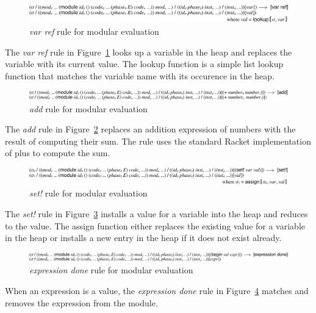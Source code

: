 \begin{figure}[!h]
  \includegraphics[width=\textwidth]{figures/eval-reduction1}
\caption{\emph{var ref} rule for modular evaluation}
\label{fig:eval-reduction1}
\end{figure}
The \emph{var ref} rule in Figure~\ref{fig:eval-reduction1} looks up a variable in the heap and replaces the variable with its current value.
The lookup function is a simple list lookup function that matches the variable name with its occurence in the heap. 

\begin{figure}[!h]
  \includegraphics[width=\textwidth]{figures/eval-reduction2}
\caption{\emph{add} rule for modular evaluation}
\label{fig:eval-reduction2}
\end{figure}
The \emph{add} rule in Figure~\ref{fig:eval-reduction2} replaces an addition expression of numbers with the result of computing their sum.
The rule uses the standard Racket implementation of plus to compute the sum.

\begin{figure}[!h]
  \includegraphics[width=\textwidth]{figures/eval-reduction3}
\caption{\emph{set!} rule for modular evaluation}
\label{fig:eval-reduction3}
\end{figure}
The \emph{set!} rule in Figure~\ref{fig:eval-reduction3} installs a value for a variable into the heap and reduces to the value.
The assign function either replaces the existing value for a variable in the heap or installs a new entry in the heap if it does not exist already.

\begin{figure}[!h]
  \includegraphics[width=\textwidth]{figures/eval-reduction4}
\caption{\emph{expression done} rule for modular evaluation}
\label{fig:eval-reduction4}
\end{figure}
When an expression is a value, the \emph{expression done} rule in Figure~\ref{fig:eval-reduction4} matches and removes the expression from the module.

